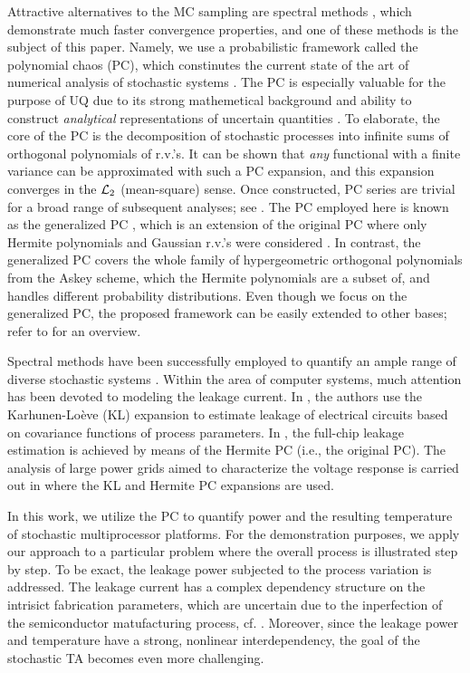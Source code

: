 Attractive alternatives to the MC sampling are spectral methods \cite{maitre2010}, which demonstrate much faster convergence properties, and one of these methods is the subject of this paper. Namely, we use a probabilistic framework called the polynomial chaos (PC), which constinutes the current state of the art of numerical analysis of stochastic systems \cite{xiu2009}. The PC is especially valuable for the purpose of UQ due to its strong mathemetical background and ability to construct \emph{analytical} representations of uncertain quantities \cite{eldred2009}. To elaborate, the core of the PC is the decomposition of stochastic processes into infinite sums of orthogonal polynomials of r.v.'s. It can be shown that \emph{any} functional with a finite variance can be approximated with such a PC expansion, and this expansion converges in the $\mathcal{L}_{2}$ (mean-square) sense. Once constructed, PC series are trivial for a broad range of subsequent analyses; see \cite{eldred2009, maitre2010}. The PC employed here is known as the generalized PC \cite{xiu2002}, which is an extension of the original PC where only Hermite polynomials and Gaussian r.v.'s were considered \cite{ghanem1991}. In contrast, the generalized PC covers the whole family of hypergeometric orthogonal polynomials from the Askey scheme, which the Hermite polynomials are a subset of, and handles different probability distributions. Even though we focus on the generalized PC, the proposed framework can be easily extended to other bases; refer to \cite{maitre2010} for an overview.

Spectral methods have been successfully employed to quantify an ample range of diverse stochastic systems \cite{xiu2010}. Within the area of computer systems, much attention has been devoted to modeling the leakage current. In \cite{bhardwaj2006}, the authors use the Karhunen-Lo\`{e}ve (KL) expansion \cite{loeve1978} to estimate leakage of electrical circuits based on covariance functions of process parameters. In \cite{shen2009}, the full-chip leakage estimation is achieved by means of the Hermite PC (i.e., the original PC). The analysis of large power grids aimed to characterize the voltage response is carried out in \cite{ghanta2006} where the KL and Hermite PC expansions are used.

In this work, we utilize the PC to quantify power and the resulting temperature of stochastic multiprocessor platforms. For the demonstration purposes, we apply our approach to a particular problem where the overall process is illustrated step by step. To be exact, the leakage power subjected to the process variation is addressed. The leakage current has a complex dependency structure on the intrisict fabrication parameters, which are uncertain due to the inperfection of the semiconductor matufacturing process, cf. \cite{juan2012, srivastava2010}. Moreover, since the leakage power and temperature have a strong, nonlinear interdependency, the goal of the stochastic TA becomes even more challenging.

